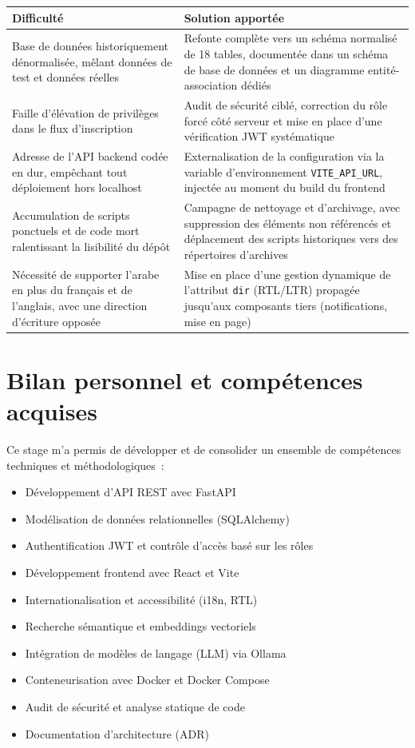 \documentclass[11pt,a4paper]{report}
\begin{document}
\begin{longtable}{@{}p{6.5cm}p{7.5cm}@{}}
\toprule
\textbf{Difficulté} & \textbf{Solution apportée} \\
\midrule
\endhead
Base de données historiquement dénormalisée, mêlant données de test et données réelles &
  Refonte complète vers un schéma normalisé de 18 tables, documentée dans un schéma de base de données et un
  diagramme entité-association dédiés \\
Faille d'élévation de privilèges dans le flux d'inscription &
  Audit de sécurité ciblé, correction du rôle forcé côté serveur et mise en place d'une vérification JWT
  systématique \\
Adresse de l'API backend codée en dur, empêchant tout déploiement hors localhost &
  Externalisation de la configuration via la variable d'environnement \texttt{VITE\_API\_URL}, injectée au
  moment du build du frontend \\
Accumulation de scripts ponctuels et de code mort ralentissant la lisibilité du dépôt &
  Campagne de nettoyage et d'archivage, avec suppression des éléments non référencés et déplacement des
  scripts historiques vers des répertoires d'archives \\
Nécessité de supporter l'arabe en plus du français et de l'anglais, avec une direction d'écriture opposée &
  Mise en place d'une gestion dynamique de l'attribut \texttt{dir} (RTL/LTR) propagée jusqu'aux composants
  tiers (notifications, mise en page) \\
\bottomrule
\end{longtable}

\chapter{Bilan personnel et compétences acquises}

Ce stage m'a permis de développer et de consolider un ensemble de compétences techniques et
méthodologiques~:

\begin{itemize}
  \item Développement d'API REST avec FastAPI
  \item Modélisation de données relationnelles (SQLAlchemy)
  \item Authentification JWT et contrôle d'accès basé sur les rôles
  \item Développement frontend avec React et Vite
  \item Internationalisation et accessibilité (i18n, RTL)
  \item Recherche sémantique et embeddings vectoriels
  \item Intégration de modèles de langage (LLM) via Ollama
  \item Conteneurisation avec Docker et Docker Compose
  \item Audit de sécurité et analyse statique de code
  \item Documentation d'architecture (ADR)
\end{itemize}
\end{document}
